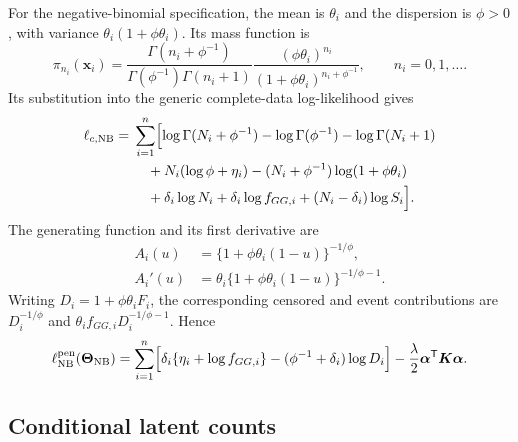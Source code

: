 \documentclass[11pt]{article}
\begin{document}
For the negative-binomial specification, the mean is $\theta_i$ and the dispersion is $\phi>0$, with variance $\theta_i(1+\phi\theta_i)$. Its mass function is
\begin{equation}
\pi_{n_i}(\bm{x}_i)
=\frac{\Gamma(n_i+\phi^{-1})}
{\Gamma(\phi^{-1})\Gamma(n_i+1)}
\frac{(\phi\theta_i)^{n_i}}
{(1+\phi\theta_i)^{n_i+\phi^{-1}}},
\qquad n_i=0,1,\ldots.
\label{eq:supp-nb-count-pmf}
\end{equation}
Its substitution into the generic complete-data log-likelihood gives
\begin{equation}
\begin{aligned}
\ell_{c,\mathrm{NB}}
={}&\sum_{i=1}^{n}\Bigl[
\log\Gamma(N_i+\phi^{-1})-\log\Gamma(\phi^{-1})
-\log\Gamma(N_i+1)\\
&\quad+N_i(\log\phi+\eta_i)
-(N_i+\phi^{-1})\log(1+\phi\theta_i)\\
&\quad+\delta_i\log N_i+\delta_i\log f_{GG,i}
+(N_i-\delta_i)\log S_i
\Bigr].
\end{aligned}
\label{eq:supp-nb-complete-loglikelihood}
\end{equation}
The generating function and its first derivative are
\begin{equation}
\begin{aligned}
A_i(u)&=\{1+\phi\theta_i(1-u)\}^{-1/\phi},\\
A_i'(u)&=\theta_i\{1+\phi\theta_i(1-u)\}^{-1/\phi-1}.
\end{aligned}
\label{eq:supp-nb-generating-function}
\end{equation}
Writing $D_i=1+\phi\theta_iF_i$, the corresponding censored and event contributions are $D_i^{-1/\phi}$ and $\theta_i f_{GG,i}D_i^{-1/\phi-1}$. Hence
\begin{equation}
\ell_{\mathrm{NB}}^{\mathrm{pen}}(\bm\Theta_{\mathrm{NB}})
=\sum_{i=1}^{n}\Bigl[
\delta_i\{\eta_i+\log f_{GG,i}\}
-(\phi^{-1}+\delta_i)\log D_i
\Bigr]
-\frac{\lambda}{2}\bm\alpha^{\mathsf T}\bm K\bm\alpha.
\label{eq:supp-nb-observed-loglikelihood}
\end{equation}

\subsection{Conditional latent counts}
\end{document}
